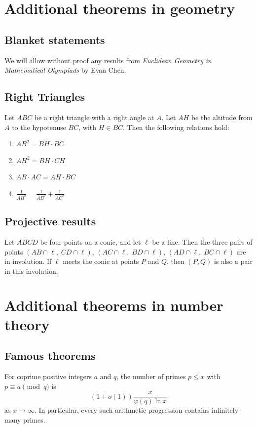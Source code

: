 \documentclass[11pt]{scrartcl}
\begin{document}
\section{Additional theorems in geometry}
\subsection{Blanket statements}
We will allow without proof any results from
\emph{Euclidean Geometry in Mathematical Olympiads} by Evan Chen.

\subsection{Right Triangles}
\begin{theorem}
  Let $ABC$ be a right triangle with a right angle at $A$. Let $AH$ be the altitude from $A$ to the hypotenuse $BC$, with $H \in BC$.
  Then the following relations hold:
  \begin{enumerate}
    \item $AB^2 = BH \cdot BC$
    \item $AH^2 = BH \cdot CH$
    \item $AB \cdot AC = AH \cdot BC$
    \item $\frac{1}{AH^2} = \frac{1}{AB^2} + \frac{1}{AC^2}$
  \end{enumerate}
\end{theorem}

\subsection{Projective results}
\begin{theorem}
  Let $ABCD$ be four points on a conic, and let $\ell$ be a line.
  Then the three pairs of points
  $(AB \cap \ell,\; CD \cap \ell)$,
  $(AC \cap \ell,\; BD \cap \ell)$,
  $(AD \cap \ell,\; BC \cap \ell)$
  are in involution.
  If $\ell$ meets the conic at points $P$ and $Q$,
  then $(P, Q)$ is also a pair in this involution.
\end{theorem}

\section{Additional theorems in number theory}
\subsection{Famous theorems}
\begin{theorem}
  For coprime positive integers $a$ and $q$,
  the number of primes $p \le x$ with $p \equiv a \pmod{q}$ is
  \[ (1+o(1)) \frac{x}{\varphi(q) \ln x} \]
  as $x \to \infty$.
  In particular, every such arithmetic progression contains infinitely many primes.
\end{theorem}
\end{document}
